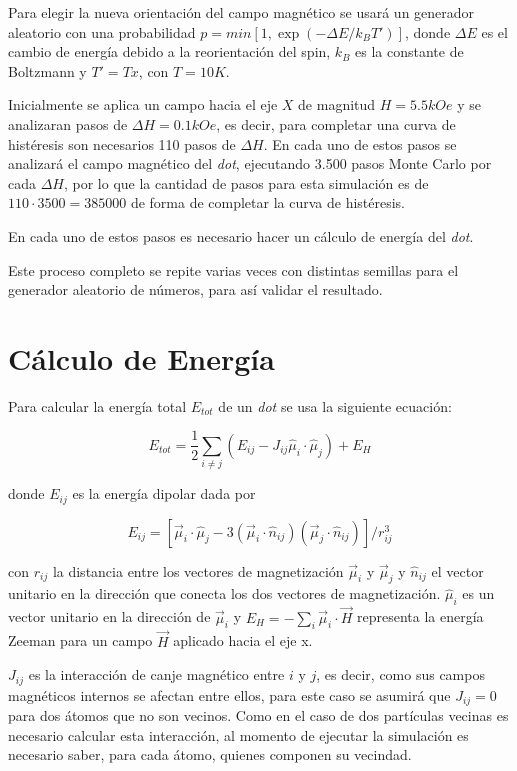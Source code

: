 Para elegir la nueva orientación del campo magnético se usará un generador aleatorio con una probabilidad $p = min[1, \exp(-\Delta E/k_BT')]$, donde $\Delta E$ es el cambio de energía debido a la reorientación del spin, $k_B$ es la constante de Boltzmann y $T' = Tx$, con $T = 10K$.

Inicialmente se aplica un campo hacia el eje $X$ de magnitud $H=5.5kOe$ y se analizaran pasos de $\Delta H = 0.1kOe$, es decir, para completar una curva de histéresis son necesarios 110 pasos de $\Delta H$. En cada uno de estos pasos se analizará el campo magnético del \emph{dot}, ejecutando 3.500 pasos Monte Carlo por cada $\Delta H$, por lo que la cantidad de pasos para esta simulación es de $110 \cdot 3500 = 385000$ de forma de completar la curva de histéresis.

En cada uno de estos pasos es necesario hacer un cálculo de energía del \emph{dot}.

Este proceso completo se repite varias veces con distintas semillas para el generador aleatorio de números, para así validar el resultado.

\section{Cálculo de Energía}

Para calcular la energía total $E_{tot}$ de un \emph{dot} se usa la siguiente ecuación:

\begin{center}
  $$E_{tot} = \frac{1}{2} \sum_{i \neq j} (E_{ij} - J_{ij} \hat{\mu}_i \cdot \hat{\mu}_j) + E_H$$
\end{center}

\noindent
donde $E_{ij}$ es la energía dipolar dada por

\begin{center}
  $$E_{ij} = [\vec{\mu}_i \cdot \hat{\mu}_j - 3(\vec{\mu}_i \cdot \hat{n}_{ij})(\vec{\mu}_j \cdot \hat{n}_{ij})]/ r^3_{ij}$$
\end{center}

\noindent
con $r_{ij}$ la distancia entre los vectores de magnetización $\vec{\mu}_i$  y $\vec{\mu}_j$ y $\hat{n}_{ij}$ el vector unitario en la dirección que conecta los dos vectores de magnetización. $\hat{\mu}_i$ es un vector unitario en la dirección de $\vec{\mu}_i$ y $E_H = - \sum_i \vec{\mu}_i \cdot \vec{H}$ representa la energía Zeeman para un campo $\vec{H}$ aplicado hacia el eje x.

$J_{ij}$ es la interacción de canje magnético entre $i$ y $j$, es decir, como sus campos magnéticos internos se afectan entre ellos, para este caso se asumirá que $J_{ij} = 0$ para dos átomos que no son vecinos. Como en el caso de dos partículas vecinas es necesario calcular esta interacción, al momento de ejecutar la simulación es necesario saber, para cada átomo, quienes componen su vecindad.
